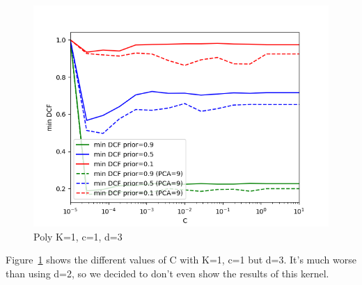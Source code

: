 \documentclass[english]{report}
\begin{document}
\begin{figure}[h!]
    \includegraphics[scale = 0.5]{../../images/validation/SVM_Poly_minDCF_comparison_K=1_c=1_d=3}
    \centering
    \caption{Poly K=1, c=1, d=3}
    \label{fig:PolySVM_d3_valid}
\end{figure}

Figure~\ref{fig:PolySVM_d3_valid} shows the different values of C with K=1, c=1 but d=3.
It's much worse than using d=2, so we decided to don't even show the results of this kernel.
\end{document}
